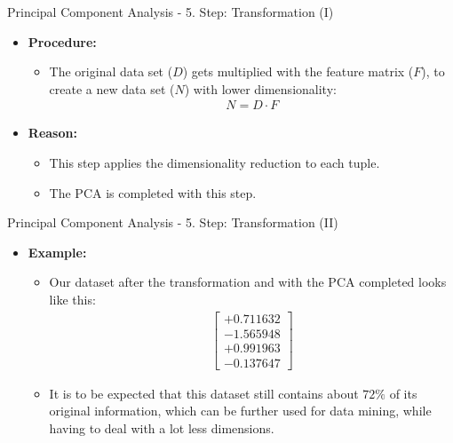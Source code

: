 \begin{frame}{Principal Component Analysis - 5. Step: Transformation (I)}
	\begin{itemize}
		\item \textbf{Procedure:}
		      \begin{itemize}
			      \item The original data set ($D$) gets multiplied with the feature
			            matrix ($F$), to create a new data set ($N$) with lower
			            dimensionality:
			            \begin{align*}
				            N = D \cdot F
			            \end{align*}
		      \end{itemize}
		\item \textbf{Reason:}
		      \begin{itemize}
			      \item This step applies the dimensionality reduction to each tuple.
			      \item The PCA is completed with this step.
		      \end{itemize}
	\end{itemize}
\end{frame}

\begin{frame}{Principal Component Analysis - 5. Step: Transformation (II)}
	\begin{itemize}
		\item \textbf{Example:}
		      \begin{itemize}
			      \item Our dataset after the transformation and with the PCA
			            completed looks like this: \\
			            \begin{align*}
				            \begin{bmatrix} +0.711632 \\ -1.565948 \\ +0.991963 \\ -0.137647
				            \end{bmatrix}
			            \end{align*}
			      \item It is to be expected that this dataset still contains about
			            $72\%$ of its original information, which can be
			            further used for data mining, while having to deal with
			            a lot less dimensions.
		      \end{itemize}
	\end{itemize}
\end{frame}

